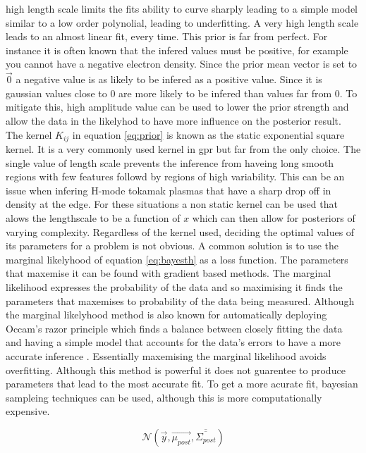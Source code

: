 high length scale limits the fits ability to curve sharply leading to a simple model similar to a low order polynolial, leading to underfitting. A very high length scale leads to an almost linear fit, every time. This prior is far from perfect. For instance it is often known that the infered values must be positive, for example you cannot have a negative electron density. Since the prior mean vector is set to $\Vec{0}$ a negative value is as likely to be infered as a positive value. Since it is gaussian values close to 0 are more likely to be infered than values far from 0. To mitigate this, high amplitude value can be used to lower the prior strength and allow the data in the likelyhod to have more influence on the posterior result. The kernel $K_{ij}$ in equation \ref{eq:prior} is known as the static exponential square kernel. It is a very commonly used kernel in \gls{gpr} but far from the only choice. The single value of length scale prevents the inference from haveing long smooth regions with few features followd by regions of high variability. This can be an issue when infering H-mode tokamak plasmas that have a sharp drop off in density at the edge. For these situations a non static kernel can be used that alows the lengthscale to be a function of $x$ which can then allow for posteriors of varying complexity. Regardless of the kernel used, deciding the optimal values of its parameters for a problem is not obvious. A common solution is to use the marginal likelyhood of equation \ref{eq:bayesth} as a loss function. The parameters that maxemise it can be found with gradient based methods. The marginal likelihood expresses the probability of the data and so maximising it finds the parameters that maxemises to probability of the data being measured. Although the marginal likelyhood method is also known for automatically deploying Occam's razor principle which finds a balance between closely fitting the data and having a simple model that accounts for the data's errors to have a more accurate inference \cite{oscraz} \cite{gp4ml}. Essentially maxemising the marginal likelihood avoids overfitting. Although this method is powerful it does not guarentee to produce parameters that lead to the most accurate fit. To get a more acurate fit, bayesian sampleing techniques can be used, although this is more computationally expensive. 

\begin{equation}
  \mathcal{N}(\Vec{y}, \Vec{\mu_{post}}, \overline{\overline{\Sigma_{post}}})
  \label{eq:posterior}
\end{equation}


